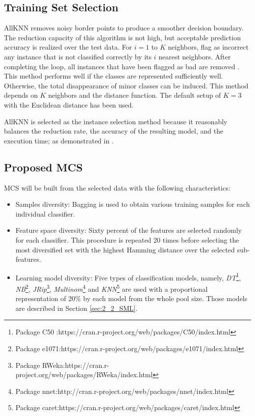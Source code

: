 \subsection{Training Set Selection} \label{Training-set-selection}
AllKNN \cite{tomek1976} removes noisy border points to produce a smoother decision boundary. The reduction capacity of this algorithm is not high, but acceptable prediction accuracy is realized over the test data. For $i=1$ to $K$ neighbors, flag as incorrect any instance that is not classified correctly by its $i$ nearest neighbors. After completing the loop, all instances that have been flagged as bad are removed \cite{alcala2011}. This method performs well if the classes are represented sufficiently well. Otherwise, the total disappearance of minor classes can be induced. This method depends on $K$ neighbors and the distance function. The default setup of $K=3$ with the Euclidean distance has been used.

AllKNN is selected as the instance selection method because it reasonably balances the reduction rate, the accuracy of the resulting model, and the execution time; as demonstrated in \cite{garcia2011}.


\subsection{Proposed MCS}\label{proposed.mcs}

MCS will be built from the selected data with the following characteristics:
\begin{itemize}[nosep]
	\item Samples diversity: Bagging is used to obtain various training samples for each individual classifier.
	\item Feature space diversity: Sixty percent of the features are selected randomly for each classifier. This procedure is repeated 20 times before selecting the most diversified set with the highest Hamming distance over the selected sub-features.
	\item Learning model diversity: Five types of classification models, namely, \textit{DT}\footnote{Package C50 :https://cran.r-project.org/web/packages/C50/index.html}, \textit{NB}\footnote{Package e1071:https://cran.r-project.org/web/packages/e1071/index.html}, \textit{JRip}\footnote{Package RWeka:https://cran.r-project.org/web/packages/RWeka/index.html}, \textit{Multinom}\footnote{Package nnet:http://cran.r-project.org/web/packages/nnet/index.html} and \textit{KNN}\footnote{Package caret:https://cran.r-project.org/web/packages/caret/index.html} are used with a proportional representation of 20\% by each model from the whole pool size. Those models are described in Section \ref{sec:2_2_SML}.
\end{itemize}




